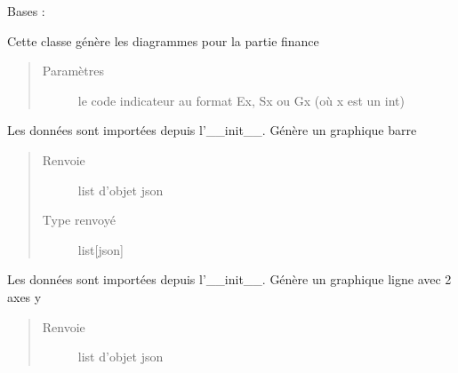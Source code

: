 \documentclass[letterpaper,10pt,french]{sphinxmanual}
\begin{document}
\begin{fulllineitems}
\label{\detokenize{app.home.content_gen:app.home.content_gen.graph_generation.FinancialChart}}
\sphinxAtStartPar
Bases : 

\sphinxAtStartPar
Cette classe génère les diagrammes pour la partie finance
\begin{quote}\begin{description}
\item[{Paramètres}] \leavevmode
\sphinxAtStartPar
{} \textendash{} 
\sphinxAtStartPar
le code indicateur au format Ex, Sx ou Gx (où x est un int)


\end{description}\end{quote}

\begin{fulllineitems}
\label{\detokenize{app.home.content_gen:app.home.content_gen.graph_generation.FinancialChart.plot_bar}}
\sphinxAtStartPar
Les données sont importées depuis l’\_\_init\_\_. Génère un graphique barre
\begin{quote}\begin{description}
\item[{Renvoie}] \leavevmode
\sphinxAtStartPar
list d’objet json

\item[{Type renvoyé}] \leavevmode
\sphinxAtStartPar
list{[}json{]}

\end{description}\end{quote}

\end{fulllineitems}


\begin{fulllineitems}
\label{\detokenize{app.home.content_gen:app.home.content_gen.graph_generation.FinancialChart.plot_mltpl_line}}
\sphinxAtStartPar
Les données sont importées depuis l’\_\_init\_\_. Génère un graphique ligne avec 2 axes y
\begin{quote}\begin{description}
\item[{Renvoie}] \leavevmode
\sphinxAtStartPar
list d’objet json


\end{description}
\end{quote}
\end{fulllineitems}
\end{fulllineitems}
\end{document}
